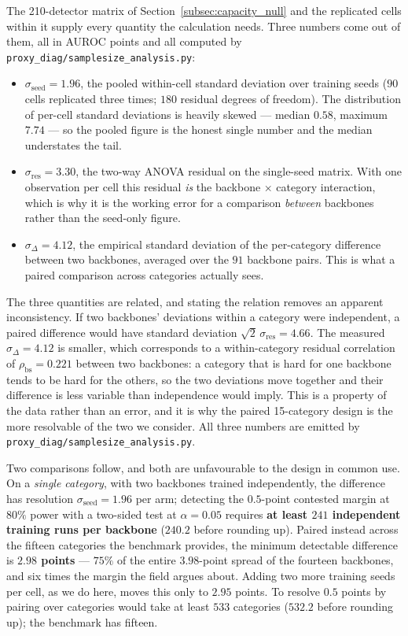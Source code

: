 The 210-detector matrix of Section~\ref{subsec:capacity_null} and the replicated
cells within it supply every quantity the calculation needs. Three numbers come
out of them, all in AUROC points and all computed by
\texttt{proxy\_diag/samplesize\_analysis.py}:

\begin{itemize}
\item $\sigma_{\text{seed}} = 1.96$, the pooled within-cell standard deviation
over training seeds ($90$ cells replicated three times; $180$ residual degrees of
freedom). The distribution of per-cell standard deviations is heavily skewed ---
median $0.58$, maximum $7.74$ --- so the pooled figure is the honest single number
and the median understates the tail.
\item $\sigma_{\text{res}} = 3.30$, the two-way ANOVA residual on the single-seed
matrix. With one observation per cell this residual \emph{is} the backbone
$\times$ category interaction, which is why it is the working error for a
comparison \emph{between} backbones rather than the seed-only figure.
\item $\sigma_{\Delta} = 4.12$, the empirical standard deviation of the
per-category difference between two backbones, averaged over the $91$ backbone
pairs. This is what a paired comparison across categories actually sees.
\end{itemize}

The three quantities are related, and stating the relation removes an apparent
inconsistency. If two backbones' deviations within a category were independent,
a paired difference would have standard deviation
$\sqrt{2}\,\sigma_{\text{res}} = 4.66$. The measured $\sigma_{\Delta} = 4.12$ is
smaller, which corresponds to a within-category residual correlation of
$\rho_{\text{bs}} = 0.221$ between two backbones: a category that is hard for one
backbone tends to be hard for the others, so the two deviations move together and
their difference is less variable than independence would imply. This is a
property of the data rather than an error, and it is why the paired 15-category
design is the more resolvable of the two we consider. All three numbers are
emitted by \texttt{proxy\_diag/samplesize\_analysis.py}.

Two comparisons follow, and both are unfavourable to the design in common use. On
a \emph{single category}, with two backbones trained independently, the difference
has resolution $\sigma_{\text{seed}} = 1.96$ per arm; detecting the $0.5$-point
contested margin at $80\%$ power with a two-sided test at $\alpha = 0.05$ requires
\textbf{at least $241$ independent training runs per backbone} ($240.2$ before
rounding up). Paired instead across the
fifteen categories the benchmark provides, the minimum detectable difference is
\textbf{$2.98$ points} --- $75\%$ of the entire $3.98$-point spread of the
fourteen backbones, and six times the margin the field argues about. Adding two
more training seeds per cell, as we do here, moves this only to $2.95$ points. To
resolve $0.5$ points by pairing over categories would take at least $533$
categories ($532.2$ before rounding up); the
benchmark has fifteen.

